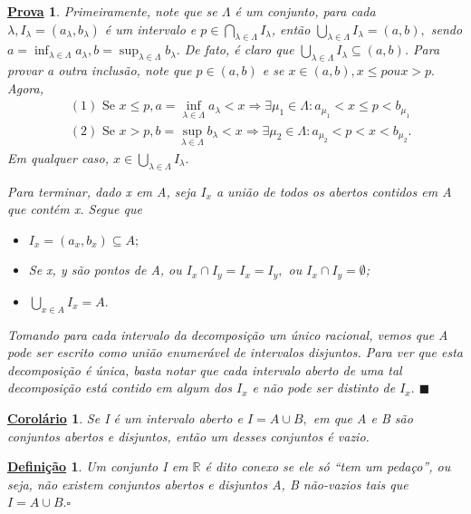 \documentclass{article}
\newtheorem*{def*}{\underline{Defini\c c\~ao}}
\newtheorem*{proof*}{\underline{Prova}}
\newtheorem*{crl*}{\underline{Corol\'ario}}
\renewcommand\qedsymbol{$\blacksquare$}
\begin{document}
  \begin{proof*}
    Primeiramente, note que se $\Lambda $ \'e um conjunto, para cada $\lambda, I_{\lambda }=(a_{\lambda }, b_{\lambda })$ \'e um intervalo
    e $p\in\bigcap_{\lambda \in\Lambda }^{}{I_{\lambda }}$, ent\~ao $\bigcup_{\lambda \in\Lambda }^{}{I_{\lambda }}=(a, b),$ sendo
    $a = \inf_{\lambda \in\Lambda }a_{\lambda }, b = \sup_{\lambda \in\Lambda }b_{\lambda }.$ De fato, \'e claro que $\bigcup_{\lambda \in\Lambda }^{}{I_{\lambda }}\subseteq{(a, b)}$.
    Para provar a outra inclus\~ao, note que $p\in(a, b)$ e se $x\in(a, b), x\leq p ou x > p.$ Agora, 
   \begin{align*}
     &(1) \text{ Se }  x\leq p, a = \inf_{\lambda \in\Lambda }a_{\lambda } < x \Rightarrow \exists \mu_{1}\in\Lambda: a_{\mu_{1}}<x\leq p < b_{\mu_{1}}\\
     &(2) \text{ Se } x > p, b=\sup_{\lambda \in\Lambda }b_{\lambda } < x \Rightarrow \exists \mu_{2}\in\Lambda: a_{\mu_{2}} < p < x < b_{\mu_{2}}.
   \end{align*}
    Em qualquer caso,  $x\in \bigcup_{\lambda \in\Lambda }^{}{I_{\lambda }}.$

    Para terminar, dado x em A, seja $I_{x}$ a uni\~ao de todos os abertos contidos em A que cont\'em x. Segue que 
   \begin{itemize}
     \item[1)] $I_{x} = (a_{x}, b_{x})\subseteq{A};$
     \item[2)] Se x, y s\~ao pontos de A, ou $I_{x}\cap I_{y}=I_{x} = I_{y},$ ou $I_{x}\cap I_{y} = \emptyset$;
     \item[3)] $\bigcup_{x\in A}^{}{I_{x}} = A.$
   \end{itemize}
   Tomando para cada intervalo da decomposi\c c\~ao um \'unico racional, vemos que A pode ser escrito como uni\~ao enumer\'avel de
   intervalos disjuntos. Para ver que esta decomposi\c c\~ao \'e \'unica, basta notar que cada intervalo aberto de uma tal decomposi\c c\~ao
   est\'a contido em algum dos $I_{x}$ e n\~ao pode ser distinto de $I_{x}.$ \qedsymbol
  \end{proof*}
  \begin{crl*}
    Se I \'e um intervalo aberto e $I = A\cup B,$ em que A e B s\~ao conjuntos abertos e disjuntos, ent\~ao um desses conjuntos \'e vazio.
  \end{crl*}
 \begin{def*}
   Um conjunto I em $\mathbb{R}$ \'e dito conexo se ele s\'o ``tem um peda\c co'', ou seja, n\~ao existem conjuntos abertos e disjuntos A, B
   n\~ao-vazios tais que $I = A\cup{B}.\square$
 \end{def*}
\end{document}
